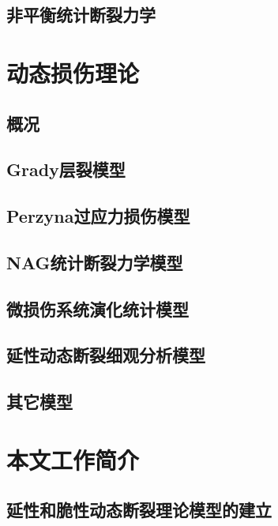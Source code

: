 \documentclass[degree=postdoc]{sysuthesis}
\begin{document}
\clearpage
\setcounter{page}{24}
\subsection{非平衡统计断裂力学}

\clearpage
\setcounter{page}{25}
\section{动态损伤理论}
\subsection{概况}

\clearpage
\setcounter{page}{27}
\subsection{Grady层裂模型}

\clearpage
\setcounter{page}{29}
\subsection{Perzyna过应力损伤模型}

\clearpage
\setcounter{page}{30}
\subsection{NAG统计断裂力学模型}

\clearpage
\setcounter{page}{33}
\subsection{微损伤系统演化统计模型}

\clearpage
\setcounter{page}{36}
\subsection{延性动态断裂细观分析模型}

\clearpage
\setcounter{page}{38}
\subsection{其它模型}

\clearpage
\setcounter{page}{39}
\section{本文工作简介}
\subsection{延性和脆性动态断裂理论模型的建立}
\end{document}
